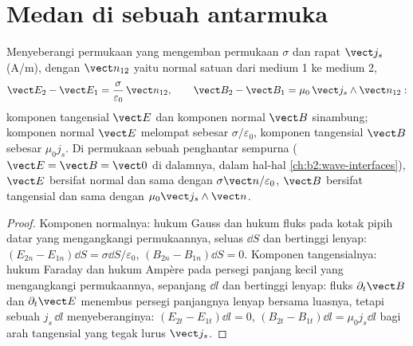 \section{Medan di sebuah antarmuka}

\begin{proposition}\label{prop:b2:maxwell-equations:boundary}
Menyeberangi permukaan yang mengemban  permukaan $\sigma$ dan
rapat  $\vect j_s$ (\unit{A/m}), dengan $\vect n_{12}$ yaitu
normal satuan dari medium 1 ke medium 2,
\[
\vect E_2 - \vect E_1 = \frac\sigma{\varepsilon_0}\,\vect n_{12} , \qquad
\vect B_2 - \vect B_1 = \mu_0\,\vect j_s\wedge\vect n_{12} :
\]
komponen tangensial $\vect E$ dan komponen normal $\vect B$
sinambung; komponen normal $\vect E$ melompat sebesar $\sigma/\varepsilon_0$,
komponen tangensial $\vect B$ sebesar $\mu_0j_s$. Di permukaan sebuah
penghantar sempurna ($\vect E = \vect B = \vect 0$ di dalamnya, dalam hal-hal
\cref{ch:b2:wave-interfaces}), $\vect E$ bersifat normal dan sama dengan $\sigma\vect n/
\varepsilon_0$, $\vect B$ bersifat tangensial dan sama dengan $\mu_0\vect j_s\wedge\vect n$.
\end{proposition}

\begin{proof}
Komponen normalnya: hukum Gauss dan hukum fluks pada kotak pipih datar
yang mengangkangi permukaannya, seluas $\dd S$ dan bertinggi lenyap: $(E_{2n}
- E_{1n})\dd S = \sigma\dd S/\varepsilon_0$, $(B_{2n} - B_{1n})\dd S = 0$. Komponen
tangensialnya: hukum Faraday dan hukum Ampère pada persegi panjang kecil
yang mengangkangi permukaannya, sepanjang $\dd l$ dan bertinggi lenyap:
fluks $\partial_t\vect B$ dan $\partial_t\vect E$ menembus persegi panjangnya lenyap
bersama luasnya, tetapi sebuah  $j_s\,\dd l$ menyeberanginya:
$(E_{2t} - E_{1t})\dd l = 0$, $(B_{2t} - B_{1t})\dd l = \mu_0j_s\dd l$ bagi
arah tangensial yang tegak lurus $\vect j_s$.
\end{proof}

